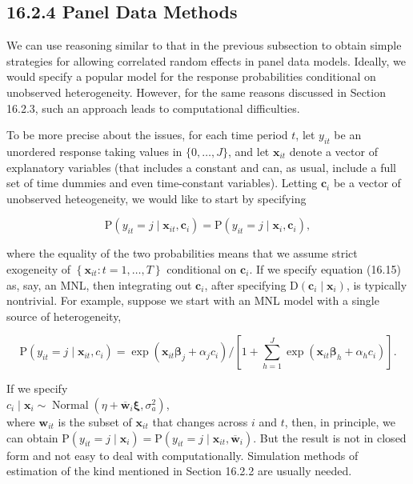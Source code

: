 \documentclass[10pt]{article}
\begin{document}
\subsection*{16.2.4 Panel Data Methods}
We can use reasoning similar to that in the previous subsection to obtain simple strategies for allowing correlated random effects in panel data models. Ideally, we would specify a popular model for the response probabilities conditional on unobserved heterogeneity. However, for the same reasons discussed in Section 16.2.3, such an approach leads to computational difficulties.

To be more precise about the issues, for each time period $t$, let $y_{i t}$ be an unordered response taking values in $\{0, \ldots, J\}$, and let $\mathbf{x}_{i t}$ denote a vector of explanatory variables (that includes a constant and can, as usual, include a full set of time dummies and even time-constant variables). Letting $\mathbf{c}_{i}$ be a vector of unobserved heteogeneity, we would like to start by specifying


\begin{equation*}
\mathrm{P}\left(y_{i t}=j \mid \mathbf{x}_{i t}, \mathbf{c}_{i}\right)=\mathrm{P}\left(y_{i t}=j \mid \mathbf{x}_{i}, \mathbf{c}_{i}\right), \tag{16.15}
\end{equation*}


where the equality of the two probabilities means that we assume strict exogeneity of $\left\{\mathbf{x}_{i t}: t=1, \ldots, T\right\}$ conditional on $\mathbf{c}_{i}$. If we specify equation (16.15) as, say, an MNL, then integrating out $\mathbf{c}_{i}$, after specifying $\mathrm{D}\left(\mathbf{c}_{i} \mid \mathbf{x}_{i}\right)$, is typically nontrivial. For example, suppose we start with an MNL model with a single source of heterogeneity,


\begin{equation*}
\mathrm{P}\left(y_{i t}=j \mid \mathbf{x}_{i t}, c_{i}\right)=\exp \left(\mathbf{x}_{i t} \boldsymbol{\beta}_{j}+\alpha_{j} c_{i}\right) /\left[1+\sum_{h=1}^{J} \exp \left(\mathbf{x}_{i t} \boldsymbol{\beta}_{h}+\alpha_{h} c_{i}\right)\right] . \tag{16.16}
\end{equation*}


If we specify\\
$c_{i} \mid \mathbf{x}_{i} \sim \operatorname{Normal}\left(\eta+\overline{\mathbf{w}}_{i} \boldsymbol{\xi}, \sigma_{a}^{2}\right)$,\\
where $\mathbf{w}_{i t}$ is the subset of $\mathbf{x}_{i t}$ that changes across $i$ and $t$, then, in principle, we can obtain $\mathrm{P}\left(y_{i t}=j \mid \mathbf{x}_{i}\right)=\mathrm{P}\left(y_{i t}=j \mid \mathbf{x}_{i t}, \overline{\mathbf{w}}_{i}\right)$. But the result is not in closed form and not easy to deal with computationally. Simulation methods of estimation of the kind mentioned in Section 16.2.2 are usually needed.
\end{document}
